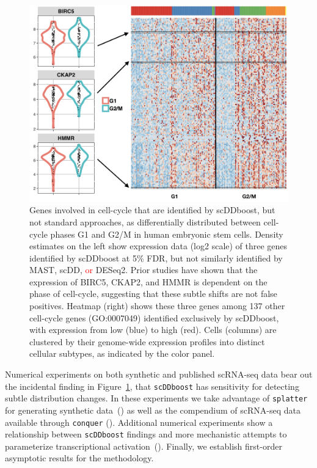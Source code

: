 \documentclass[aoas,preprint]{imsart}
\begin{document}
\begin{figure}[H]
\includegraphics[width=\textwidth]{Figs/Fig1.png}

 \caption{Genes involved in cell-cycle that are identified by scDDboost, but not standard approaches,
 as differentially distributed between cell-cycle phases G1 and G2/M in human embryonic stem cells. 
  Density estimates on the left show expression data (log2 scale)
of three genes identified by scDDboost at 5\% FDR, but not similarly identified by MAST, scDD, \textcolor{red}{or}  DESeq2.
 Prior studies have shown that the expression
 of  BIRC5, CKAP2, and HMMR is dependent on the phase of cell-cycle,
 suggesting that these subtle shifts are not false positives. 
 Heatmap (right) shows these three genes among 137 other cell-cycle genes (GO:0007049) identified
exclusively by scDDboost, with expression from low (blue) to high 
(red).  Cells (columns) are clustered by their genome-wide
expression profiles into distinct cellular subtypes, as indicated by the color panel.}


 \label{fig:whet} 
\end{figure}


Numerical experiments on both synthetic and published scRNA-seq data bear out the incidental finding 
in Figure~\ref{fig:whet}, that \verb+scDDboost+ has sensitivity for detecting subtle distribution changes. 
  In these experiments we take advantage of
\verb+splatter+ for generating synthetic data~(\cite{ref:Zappia}) as well as the compendium of scRNA-seq
data available through \verb+conquer+ (\cite{ref:Cq}).  Additional numerical experiments show a relationship
 between \verb+scDDboost+ findings and more mechanistic attempts to parameterize transcriptional
 activation~(\cite{ref:d3e}).  Finally, we establish first-order asymptotic results for the methodology.  
\end{document}
